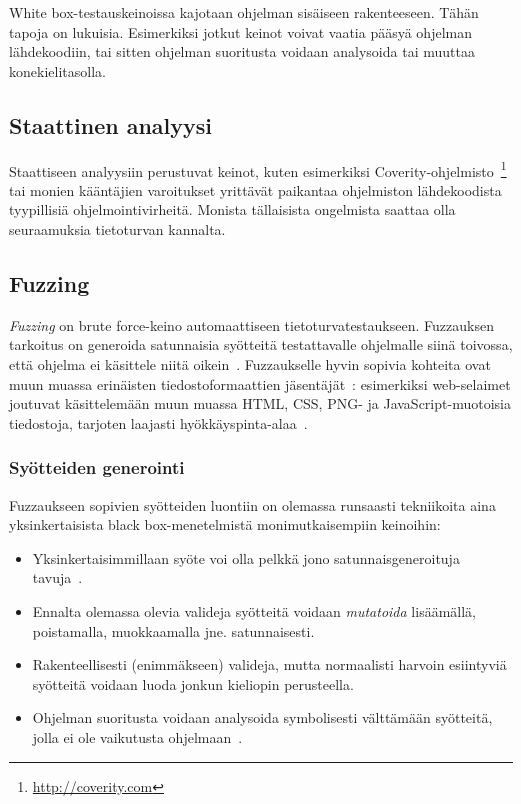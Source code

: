 White box-testauskeinoissa kajotaan ohjelman sisäiseen rakenteeseen.
Tähän tapoja on lukuisia.
Esimerkiksi jotkut keinot voivat vaatia pääsyä ohjelman lähdekoodiin,
tai sitten ohjelman suoritusta voidaan analysoida tai muuttaa konekielitasolla.

\subsection{Staattinen analyysi}

Staattiseen analyysiin perustuvat keinot,
kuten esimerkiksi Coverity-ohjelmisto~\footnote{\url{http://coverity.com}} tai monien kääntäjien varoitukset yrittävät paikantaa ohjelmiston lähdekoodista tyypillisiä ohjelmointivirheitä.
Monista tällaisista ongelmista saattaa olla seuraamuksia tietoturvan kannalta.

\subsection{Fuzzing}

\emph{Fuzzing} on brute force-keino automaattiseen tietoturvatestaukseen.
Fuzzauksen tarkoitus on generoida satunnaisia syötteitä testattavalle ohjelmalle siinä toivossa, että ohjelma ei käsittele niitä oikein~\cite{UnixReliability}.
Fuzzaukselle hyvin sopivia kohteita ovat muun muassa erinäisten tiedostoformaattien jäsentäjät~\cite{SageArtikkeli,OuluBrowser}:
esimerkiksi web-selaimet joutuvat käsittelemään muun muassa HTML, CSS, PNG- ja JavaScript-muotoisia tiedostoja, tarjoten laajasti hyökkäyspinta-alaa~\cite{OuluBrowser}.

\subsubsection{Syötteiden generointi}

Fuzzaukseen sopivien syötteiden luontiin on olemassa runsaasti tekniikoita aina yksinkertaisista black box-menetelmistä monimutkaisempiin keinoihin:
\begin{itemize}
    \item Yksinkertaisimmillaan syöte voi olla pelkkä jono satunnaisgeneroituja tavuja~\cite{UnixReliability}.
    \item Ennalta olemassa olevia valideja syötteitä voidaan \emph{mutatoida} lisäämällä, poistamalla, muokkaamalla jne. satunnaisesti.
    \item Rakenteellisesti (enimmäkseen) valideja, mutta normaalisti harvoin esiintyviä syötteitä voidaan luoda jonkun kieliopin perusteella.
    \item Ohjelman suoritusta voidaan analysoida symbolisesti välttämään syötteitä, jolla ei ole vaikutusta ohjelmaan~\cite{SageArtikkeli}.
\end{itemize}



